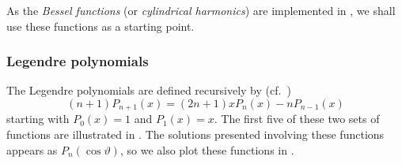 As the \textit{Bessel functions} (or \textit{cylindrical harmonics}) are implemented in \MATLAB, we shall use these functions as a starting point. 

\subsubsection{Legendre polynomials}
The Legendre polynomials are defined recursively by (cf.~\cite[p. 332]{Abramovitz1964ham})
\begin{equation*}
	(n+1)P_{n+1}(x)=(2n+1)xP_n(x)-nP_{n-1}(x)
\end{equation*}
starting with $P_0(x) = 1$ and $P_1(x) = x$. The first five of these two sets of functions are illustrated in . The solutions presented involving these functions appears as $P_n(\cos\vartheta)$, so we also plot these functions in .
